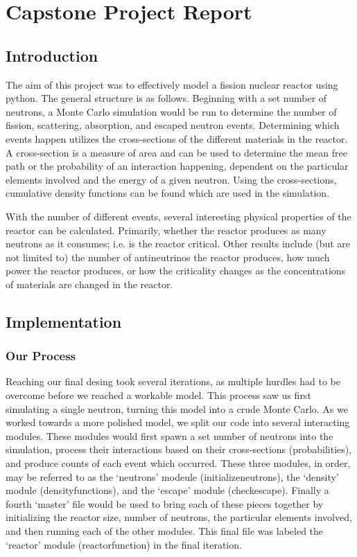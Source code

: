 \documentclass{notes}
\begin{document}
\section*{Capstone Project Report}

\subsection*{Introduction}

The aim of this project was to effectively model a fission nuclear reactor using python. The general structure is as follows. Beginning with a set number of neutrons, a Monte Carlo simulation would be run to determine the number of fission, scattering, absorption, and escaped neutron events. Determining which events happen utilizes the cross-sections of the different materials in the reactor. A cross-section is a measure of area and can be used to determine the mean free path or the probability of an interaction happening, dependent on the particular elements involved and the energy of a given neutron. Using the cross-sections, cumulative density functions can be found which are used in the simulation. 

With the number of different events, several interesting physical properties of the reactor can be calculated. Primarily, whether the reactor produces as many neutrons as it consumes; i.e. is the reactor critical. Other results include (but are not limited to) the number of antineutrinos the reactor produces, how much power the reactor produces, or how the criticality changes as the concentrations of materials are changed in the reactor.

\subsection*{Implementation}

\subsubsection*{Our Process}

Reaching our final desing took several iterations, as multiple hurdles had to be overcome before we reached a workable model. This process saw us first simulating a single neutron, turning this model into a crude Monte Carlo. As we worked towards a more polished model, we split our code into several interacting modules. These modules would first spawn a set number of neutrons into the simulation, process their interactions based on their cross-sections (probabilities), and produce counts of each event which occurred. These three modules, in order, may be referred to as the `neutrons' modeule (initialize\textunderscore neutrons), the `density' module (density\textunderscore functions), and the `escape' module (check\textunderscore escape). Finally a fourth `master' file would be used to bring each of these pieces together by initializing the reactor size, number of neutrons, the particular elements involved, and then running each of the other modules. This final file was labeled the `reactor' module (reactor\textunderscore function) in the final iteration.
\end{document}
